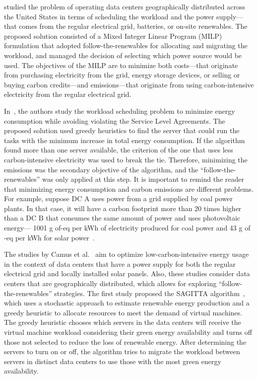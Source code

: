 \citet{RUIZDUARTE2023_operation_dcs_renewables} studied the problem of operating data centers geographically distributed across the United States in terms of scheduling the workload and the power supply---that comes from the regular electrical grid, batteries, or on-site renewables. The proposed solution consisted of a Mixed Integer Linear Program (MILP) formulation that adopted follow-the-renewables for allocating and migrating the workload, and managed the decision of selecting which power source would be used. The objectives of the MILP are to minimize both costs---that originate from purchasing electricity from the grid, energy storage devices, or selling or buying carbon credits---and  emissions---that originate from using carbon-intensive electricity from the regular electrical grid.

In~\citet{KHODAYARSERESHT2023_energycarbonaware_vm}, the authors study the workload scheduling problem to minimize energy consumption while avoiding violating the Service Level Agreements. The proposed solution used greedy heuristics to find the server that could run the tasks with the minimum increase in total energy consumption. If the algorithm found more than one server available, the criterion of the one that uses less carbon-intensive electricity was used to break the tie. Therefore, minimizing the emissions was the secondary objective of the algorithm, and the ``follow-the-renewables'' was only applied at this step. It is important to remind the reader that minimizing energy consumption and carbon emissions are different problems. For example, suppose DC A uses power from a grid supplied by coal power plants. In that case, it will have a carbon footprint more than 20 times higher than a DC B that consumes the same amount of power and uses photovoltaic energy--- 1001 g of-eq per kWh of electricity produced for coal power and 43  g of -eq per kWh for solar power~\cite{nrel_lifecycle_2021}. 

The studies by Camus et al.~\cite{SAGITTA,NEMESIS,SCORPIOUS} aim to optimize low-carbon-intensive energy usage in the context of data centers that have a power supply for both the regular electrical grid and locally installed solar panels. Also, these studies consider data centers that are geographically distributed, which allows for exploring ``follow-the-renewables'' strategies. The first study proposed the SAGITTA algorithm~\citep{SAGITTA}, which uses a stochastic approach to estimate renewable energy production and a greedy heuristic to allocate resources to meet the demand of virtual machines. The greedy heuristic chooses which servers in the data centers will receive the virtual machine workload considering their green energy availability and turns off those not selected to reduce the loss of renewable energy. After determining the servers to turn on or off, the algorithm tries to migrate the workload between servers in distinct data centers to use those with the most green energy availability. 

